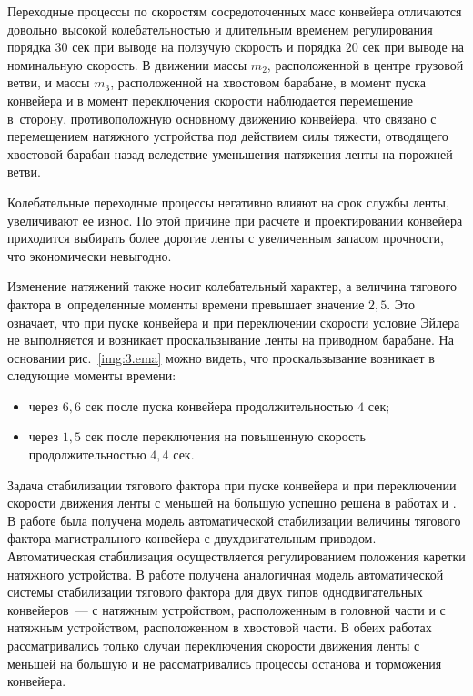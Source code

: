 Переходные процессы по скоростям сосредоточенных масс конвейера отличаются довольно высокой колебательностью и длительным временем регулирования порядка $30$ сек при выводе на ползучую скорость и порядка $20$ сек при выводе на номинальную скорость. В движении массы $ m_2 $, расположенной в центре грузовой ветви, и массы $ m_3 $, расположенной на хвостовом барабане, в момент пуска конвейера и в момент переключения скорости наблюдается перемещение в~сторону, противоположную основному движению конвейера, что связано с перемещением натяжного устройства под действием силы тяжести, отводящего хвостовой барабан назад вследствие уменьшения натяжения ленты на порожней ветви.

Колебательные переходные процессы негативно влияют на срок службы ленты, увеличивают ее износ. По этой причине при расчете и проектировании конвейера приходится выбирать более дорогие ленты с увеличенным запасом прочности, что экономически невыгодно.


Изменение натяжений также носит колебательный характер, а величина тягового фактора в~определенные моменты времени превышает значение $2,5$. Это означает, что при пуске конвейера и при переключении скорости условие Эйлера не выполняется и возникает проскальзывание ленты на приводном барабане. На основании рис.~\ref{img:3.ema} можно видеть, что проскальзывание возникает в следующие моменты времени:
\begin{itemize}
\item через $6,6$ сек после пуска конвейера продолжительностью $4$ сек;
\item через $1,5$ сек после переключения на повышенную скорость продолжительностью $4,4$ сек.
\end{itemize}

Задача стабилизации тягового фактора при пуске конвейера и при переключении скорости движения ленты с меньшей на большую успешно решена в работах \cite{vdmitrieva} и \cite{sgershun}. В работе \cite{sgershun} была получена модель автоматической стабилизации величины тягового фактора магистрального конвейера с двухдвигательным приводом. Автоматическая стабилизация осуществляется регулированием положения каретки натяжного устройства. В работе \cite{vdmitrieva} получена аналогичная модель автоматической системы стабилизации тягового фактора для двух типов однодвигательных конвейеров~--- с натяжным устройством, расположенным в головной части и с натяжным устройством, расположенном в хвостовой части. В обеих работах рассматривались только случаи переключения скорости движения ленты с меньшей на большую и не рассматривались процессы останова и торможения конвейера.

